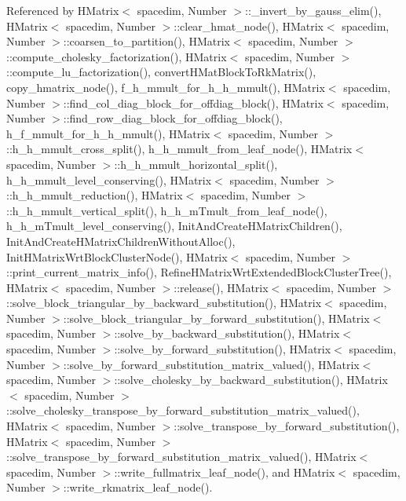 Referenced by H\+Matrix$<$ spacedim, Number $>$\+::\+\_\+invert\+\_\+by\+\_\+gauss\+\_\+elim(), H\+Matrix$<$ spacedim, Number $>$\+::clear\+\_\+hmat\+\_\+node(), H\+Matrix$<$ spacedim, Number $>$\+::coarsen\+\_\+to\+\_\+partition(), H\+Matrix$<$ spacedim, Number $>$\+::compute\+\_\+cholesky\+\_\+factorization(), H\+Matrix$<$ spacedim, Number $>$\+::compute\+\_\+lu\+\_\+factorization(), convert\+H\+Mat\+Block\+To\+Rk\+Matrix(), copy\+\_\+hmatrix\+\_\+node(), f\+\_\+h\+\_\+mmult\+\_\+for\+\_\+h\+\_\+h\+\_\+mmult(), H\+Matrix$<$ spacedim, Number $>$\+::find\+\_\+col\+\_\+diag\+\_\+block\+\_\+for\+\_\+offdiag\+\_\+block(), H\+Matrix$<$ spacedim, Number $>$\+::find\+\_\+row\+\_\+diag\+\_\+block\+\_\+for\+\_\+offdiag\+\_\+block(), h\+\_\+f\+\_\+mmult\+\_\+for\+\_\+h\+\_\+h\+\_\+mmult(), H\+Matrix$<$ spacedim, Number $>$\+::h\+\_\+h\+\_\+mmult\+\_\+cross\+\_\+split(), h\+\_\+h\+\_\+mmult\+\_\+from\+\_\+leaf\+\_\+node(), H\+Matrix$<$ spacedim, Number $>$\+::h\+\_\+h\+\_\+mmult\+\_\+horizontal\+\_\+split(), h\+\_\+h\+\_\+mmult\+\_\+level\+\_\+conserving(), H\+Matrix$<$ spacedim, Number $>$\+::h\+\_\+h\+\_\+mmult\+\_\+reduction(), H\+Matrix$<$ spacedim, Number $>$\+::h\+\_\+h\+\_\+mmult\+\_\+vertical\+\_\+split(), h\+\_\+h\+\_\+m\+Tmult\+\_\+from\+\_\+leaf\+\_\+node(), h\+\_\+h\+\_\+m\+Tmult\+\_\+level\+\_\+conserving(), Init\+And\+Create\+H\+Matrix\+Children(), Init\+And\+Create\+H\+Matrix\+Children\+Without\+Alloc(), Init\+H\+Matrix\+Wrt\+Block\+Cluster\+Node(), H\+Matrix$<$ spacedim, Number $>$\+::print\+\_\+current\+\_\+matrix\+\_\+info(), Refine\+H\+Matrix\+Wrt\+Extended\+Block\+Cluster\+Tree(), H\+Matrix$<$ spacedim, Number $>$\+::release(), H\+Matrix$<$ spacedim, Number $>$\+::solve\+\_\+block\+\_\+triangular\+\_\+by\+\_\+backward\+\_\+substitution(), H\+Matrix$<$ spacedim, Number $>$\+::solve\+\_\+block\+\_\+triangular\+\_\+by\+\_\+forward\+\_\+substitution(), H\+Matrix$<$ spacedim, Number $>$\+::solve\+\_\+by\+\_\+backward\+\_\+substitution(), H\+Matrix$<$ spacedim, Number $>$\+::solve\+\_\+by\+\_\+forward\+\_\+substitution(), H\+Matrix$<$ spacedim, Number $>$\+::solve\+\_\+by\+\_\+forward\+\_\+substitution\+\_\+matrix\+\_\+valued(), H\+Matrix$<$ spacedim, Number $>$\+::solve\+\_\+cholesky\+\_\+by\+\_\+backward\+\_\+substitution(), H\+Matrix$<$ spacedim, Number $>$\+::solve\+\_\+cholesky\+\_\+transpose\+\_\+by\+\_\+forward\+\_\+substitution\+\_\+matrix\+\_\+valued(), H\+Matrix$<$ spacedim, Number $>$\+::solve\+\_\+transpose\+\_\+by\+\_\+forward\+\_\+substitution(), H\+Matrix$<$ spacedim, Number $>$\+::solve\+\_\+transpose\+\_\+by\+\_\+forward\+\_\+substitution\+\_\+matrix\+\_\+valued(), H\+Matrix$<$ spacedim, Number $>$\+::write\+\_\+fullmatrix\+\_\+leaf\+\_\+node(), and H\+Matrix$<$ spacedim, Number $>$\+::write\+\_\+rkmatrix\+\_\+leaf\+\_\+node().

